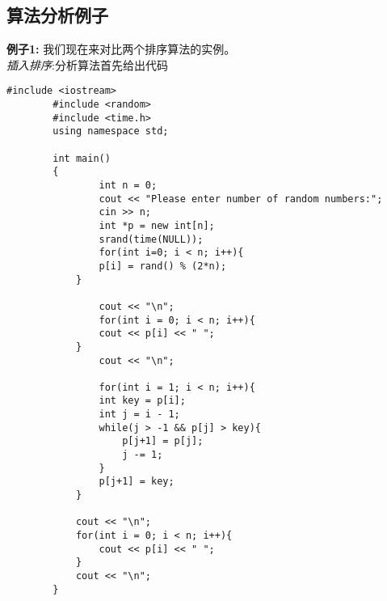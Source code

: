 \documentclass[a4paper,12pt]{ctexart}
\begin{document}
	\subsection{算法分析例子}
		\indent \textbf{例子1:} 我们现在来对比两个排序算法的实例。
		\\ \indent \textit{插入排序}:分析算法首先给出代码
		\begin{lstlisting}[title=插入排序, frame=shadowbox]
		#include <iostream>
		#include <random>
		#include <time.h>
		using namespace std;

		int main()
		{
    			int n = 0;
    			cout << "Please enter number of random numbers:";
    			cin >> n;
    			int *p = new int[n];
    			srand(time(NULL));
    			for(int i=0; i < n; i++){
        		p[i] = rand() % (2*n);
    		}

    			cout << "\n";
    			for(int i = 0; i < n; i++){
        		cout << p[i] << " ";
    		}
    			cout << "\n";

    			for(int i = 1; i < n; i++){
        		int key = p[i];
        		int j = i - 1;
        		while(j > -1 && p[j] > key){
            		p[j+1] = p[j];
            		j -= 1;
        		}
        		p[j+1] = key;
    		}

    		cout << "\n";
    		for(int i = 0; i < n; i++){
        		cout << p[i] << " ";
    		}
    		cout << "\n";
		}
		
		\end{lstlisting}
\end{document}
